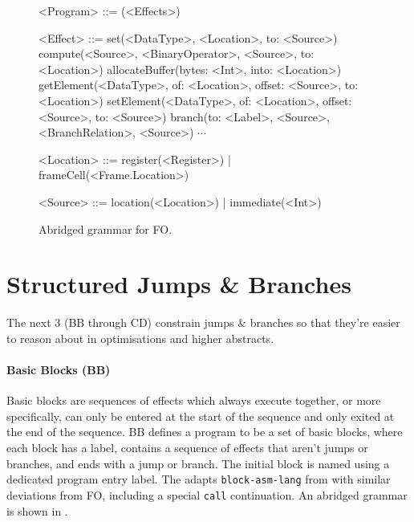 \documentclass[main.tex]{subfiles}
\begin{document}
\begin{figure}[ht]
	\begin{grammar}
		
		<Program> ::= (<Effects>)
		
		<Effect> ::= set(<DataType>, <Location>, to: <Source>)
			\alt compute(<Source>, <BinaryOperator>, <Source>, to: <Location>)
			\alt allocateBuffer(bytes: <Int>, into: <Location>)
			\alt getElement(<DataType>, of: <Location>, offset: <Source>, to: <Location>)
			\alt setElement(<DataType>, of: <Location>, offset: <Source>, to: <Source>)
			\alt branch(to: <Label>, <Source>, <BranchRelation>, <Source>)
			\alt $\cdots$
		
		<Location> ::= register(<Register>) | frameCell(<Frame.Location>)
		
		<Source> ::= location(<Location>) | immediate(<Int>)
		
	\end{grammar}
	\caption{Abridged grammar for FO.}
	\label{bnf:fo}
\end{figure}

\section{Structured Jumps \& Branches}
The next 3 \ils{} (BB through CD) constrain jumps \& branches so that they're easier to reason about in optimisations and higher abstracts.

\paragraph{Basic Blocks (BB)} Basic blocks are sequences of effects which always execute together, or more specifically, can only be entered at the start of the sequence and only exited at the end of the sequence. BB defines a program to be a set of basic blocks, where each block has a label, contains a sequence of effects that aren't jumps or branches, and ends with a jump or branch. The initial block is named using a dedicated program entry label. The \il{} adapts \texttt{block-asm-lang} from \cite{compcourse} with similar deviations from FO, including a special \texttt{call} continuation. An abridged grammar is shown in .
\end{document}

